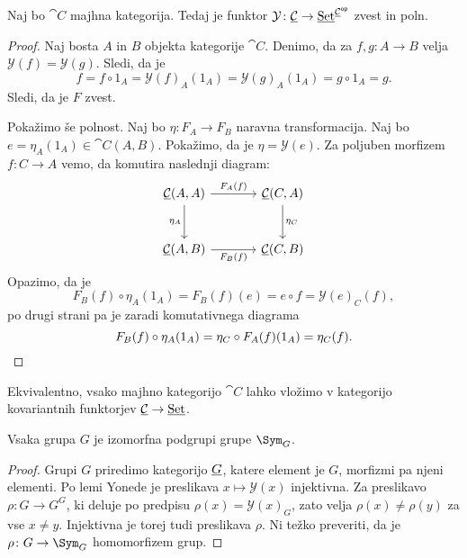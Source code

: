 \begin{izrek}
Naj bo $\cat{C}$ majhna kategorija. Tedaj je funktor
$\mathcal{Y} \colon \underline{\mathcal{C}} \to
\underline{\operatorname{Set}}^{\underline{\mathcal{C}}^{\mathsf{op}}}$ zvest in poln.
\end{izrek}

\begin{proof}
Naj bosta $A$ in $B$ objekta kategorije $\cat{C}$. Denimo, da za
$f, g \colon A \to B$ velja $\mathcal{Y}(f) = \mathcal{Y}(g)$.
Sledi, da je
\[
f =
f \circ 1_{A} =
\mathcal{Y}(f)_A(1_A) =
\mathcal{Y}(g)_A(1_A) =
g \circ 1_A =
g.
\]
Sledi, da je $F$ zvest.

Pokažimo še polnost. Naj bo $\eta \colon F_A \to F_B$ naravna
transformacija. Naj bo $e = \eta_A(1_A) \in \cat{C}(A,B)$.
Pokažimo, da je $\eta = \mathcal{Y}(e)$. Za poljuben morfizem
$f \colon C \to A$ vemo, da komutira naslednji diagram:
\[
\begin{tikzcd}[column sep=large, row sep=large]
\cat{C}(A,A) \arrow[r, "F_A(f)"] \arrow[d, "\eta_A"'] &
\cat{C}(C,A) \arrow[d, "\eta_C"] \\
\cat{C}(A,B) \arrow[r, "F_B(f)"'] &
\cat{C}(C,B)
\end{tikzcd}
\]
Opazimo, da je
\[
F_B(f) \circ \eta_A(1_A) =
F_B(f)(e) =
e \circ f =
\mathcal{Y}(e)_C(f),
\]
po drugi strani pa je zaradi komutativnega diagrama
\[
F_B(f) \circ \eta_A(1_A) =
\eta_C \circ F_A(f)(1_A) =
\eta_C(f). \qedhere
\]
\end{proof}

\begin{opomba}
Ekvivalentno, vsako majhno kategorijo $\cat{C}$ lahko vložimo v
kategorijo kovariantnih funktorjev
$\underline{\mathcal{C}} \to \underline{\operatorname{Set}}$.
\end{opomba}

\begin{posledica}
Vsaka grupa $G$ je izomorfna podgrupi grupe $\Sym_G$.
\end{posledica}

\begin{proof}
Grupi $G$ priredimo kategorijo $\underline{G}$, katere element je $G$,
morfizmi pa njeni elementi. Po lemi Yonede je preslikava
$x \mapsto \mathcal{Y}(x)$ injektivna. Za preslikavo
$\rho \colon G \to G^G$, ki deluje po predpisu
$\rho(x) = \mathcal{Y}(x)_G$, zato velja $\rho(x) \ne \rho(y)$ za
vse $x \ne y$. Injektivna je torej tudi preslikava $\rho$. Ni težko
preveriti, da je $\rho \colon G \to \Sym_G$ homomorfizem grup.
\end{proof}
